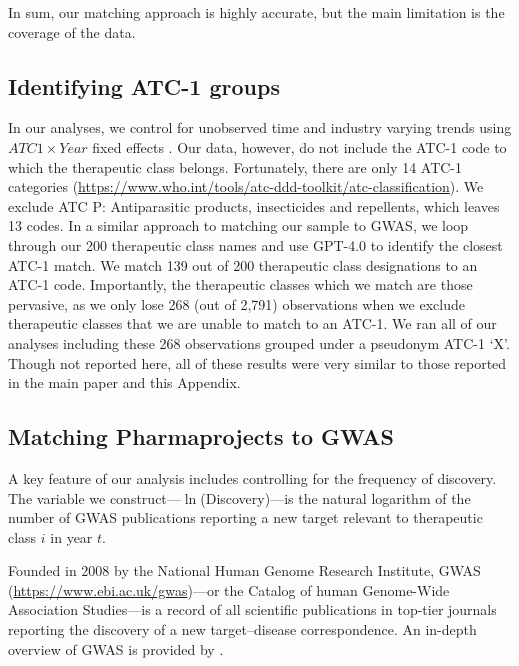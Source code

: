 In sum, our matching approach is highly accurate, but the main limitation is the coverage of the data.

\subsection{Identifying ATC-1 groups}\label{app:indentify_atc1}

In our analyses, we control for unobserved time and industry varying trends using $ATC1\times{Year}$ fixed effects \citep{branstetter2022generic}. Our data, however, do not include the ATC-1 code to which the therapeutic class belongs. Fortunately, there are only 14 ATC-1 categories (\url{https://www.who.int/tools/atc-ddd-toolkit/atc-classification}). We exclude ATC P: Antiparasitic products, insecticides and repellents, which leaves 13 codes. In a similar approach to matching our sample to GWAS, we loop through our 200 therapeutic class names and use GPT-4.0 to identify the closest ATC-1 match. We match 139 out of 200 therapeutic class designations to an ATC-1 code. Importantly, the therapeutic classes which we match are those pervasive, as we only lose 268 (out of 2,791) observations when we exclude therapeutic classes that we are unable to match to an ATC-1. We ran all of our analyses including these 268 observations grouped under a pseudonym ATC-1 `X'. Though not reported here, all of these results were very similar to those reported in the main paper and this Appendix.

\subsection{Matching Pharmaprojects to GWAS}\label{app:matching_pharma_to_gwas}


A key feature of our analysis includes controlling for the frequency of discovery. The variable we construct---$\ln$(Discovery)---is the natural logarithm of the number of GWAS publications reporting a new target relevant to therapeutic class $i$ in year $t$. 

Founded in 2008 by the National Human Genome Research Institute, GWAS (\url{https://www.ebi.ac.uk/gwas})---or the Catalog of human Genome-Wide Association Studies---is a record of all scientific publications in top-tier journals reporting the discovery of a new target--disease correspondence. An in-depth overview of GWAS is provided by \citet{tranchero2023finding}. 

